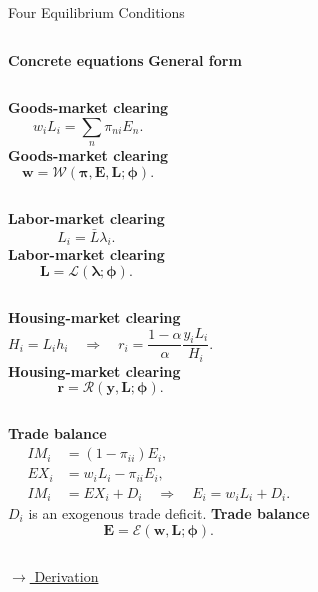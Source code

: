 \documentclass[aspectratio=169,11pt]{beamer}
\newcommand{\B}[1]{\textcolor{blue1}{\textbf{#1}}}
\newcommand{\derivlink}[1]{%
  \hyperlink{#1}{\textcolor{blue1}{\footnotesize
  \(\longrightarrow\) Derivation}}}
\begin{document}
\begin{frame}[t,label=mainEquilibrium]{Four Equilibrium Conditions}
  \small
  \setlength{\abovedisplayskip}{2pt}
  \setlength{\belowdisplayskip}{2pt}
  \setlength{\abovedisplayshortskip}{2pt}
  \setlength{\belowdisplayshortskip}{2pt}

  \begin{columns}[T,onlytextwidth]
      \B{Concrete equations}
      \B{General form}
  \end{columns}

  \smallskip
  \begin{columns}[T,onlytextwidth]
      \B{Goods-market clearing}
      \[
        w_iL_i=\sum_n\pi_{ni}E_n.
      \]
      \B{Goods-market clearing}
      \[
        \mathbf w
        =\mathcal W(\boldsymbol\pi,\mathbf E,\mathbf L;\boldsymbol\phi).
      \]
  \end{columns}

  \smallskip
  \begin{columns}[T,onlytextwidth]
      \B{Labor-market clearing}
      \[
        L_i=\bar L\lambda_i.
      \]
      \B{Labor-market clearing}
      \[
        \mathbf L
        =\mathcal L(\boldsymbol\lambda;\boldsymbol\phi).
      \]
  \end{columns}

  \medskip
  \begin{columns}[T,onlytextwidth]
      \B{Housing-market clearing}
      \[
        H_i=L_ih_i
        \quad\Longrightarrow\quad
        r_i=\frac{1-\alpha}{\alpha}\frac{y_iL_i}{H_i}.
      \]
      \B{Housing-market clearing}
      \[
        \mathbf r
        =\mathcal R(\mathbf y,\mathbf L;\boldsymbol\phi).
      \]
  \end{columns}

  \medskip
  \begin{columns}[T,onlytextwidth]
      \B{Trade balance}
      \[
        \begin{aligned}
          IM_i&=(1-\pi_{ii})E_i,\\
          EX_i&=w_iL_i-\pi_{ii}E_i,\\
          IM_i&=EX_i+D_i
            \quad\Longrightarrow\quad E_i=w_iL_i+D_i.
        \end{aligned}
      \]
      {\footnotesize \(D_i\) is an exogenous trade deficit.}
      \B{Trade balance}
      \[
        \mathbf E
        =\mathcal E(\mathbf w,\mathbf L;\boldsymbol\phi).
      \]
  \end{columns}

  \vfill
  \hfill\derivlink{appEquilibrium}
\end{frame}
\end{document}
